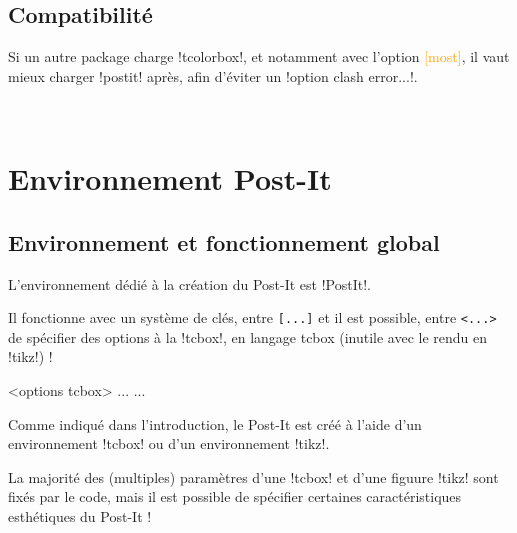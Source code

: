 \documentclass[french,a4paper,11pt]{article}
\newcommand\Cle[1]{{\small\sffamily\textlangle \textcolor{orange}{#1}\textrangle}}
\begin{document}
\subsection{Compatibilité}

\begin{cautionblock}
Si un autre package charge \packagetex!tcolorbox!, et notamment avec l'option \Cle{[most]}, il vaut mieux charger \packagetex!postit! après, afin d'éviter un \motcletex!option clash error...!.
\end{cautionblock}


\vfill~

\pagebreak

\section{Environnement Post-It}

\subsection{Environnement et fonctionnement global}

\begin{cautionblock}
L'environnement dédié à la création du Post-It est \packagetex!PostIt!.

Il fonctionne avec un système de clés, entre \texttt{[...]} et il est possible, entre \texttt{<...>} de spécifier des options à la \motcletex!tcbox!, en langage \textsf{tcbox} (inutile avec le rendu en \motcletex!tikz!) !
\end{cautionblock}

\begin{DemoCode}
\begin{PostIt}[clés]<options tcbox>
...
...
\end{PostIt}
\end{DemoCode}

\begin{noteblock}
Comme indiqué dans l'introduction, le Post-It est créé à l'aide d'un environnement \motcletex!tcbox! ou d'un environnement \motcletex!tikz!.

La majorité des (multiples) paramètres d'une \motcletex!tcbox! et d'une figuure \motcletex!tikz! sont fixés par le code, mais il est possible de spécifier certaines caractéristiques esthétiques du Post-It !
\end{noteblock}
\end{document}
